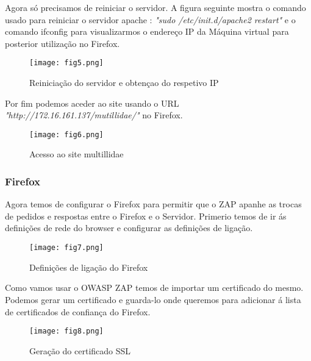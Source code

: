 Agora só precisamos de reiniciar o servidor. A figura seguinte mostra o comando usado para reiniciar o servidor apache : \textit{"sudo /etc/init.d/apache2 restart"} e o comando ifconfig para visualizarmos o endereço IP da Máquina virtual para posterior utilização no Firefox.

\begin{figure}[H]

  \centering

  \texttt{[image: fig5.png]}
 
  \caption{Reiniciação do servidor e obtençao do respetivo IP}

\end{figure}


Por fim podemos aceder ao site usando o URL \textit{"http://172.16.161.137/mutillidae/"} no Firefox.

\begin{figure}[H]

  \centering

  \texttt{[image: fig6.png]}

  \caption{Acesso ao site multillidae}

\end{figure}

\subsubsection{Firefox}

Agora temos de configurar o Firefox para permitir que o ZAP apanhe as trocas de pedidos e respostas entre o Firefox e o Servidor.
Primerio temos de ir ás definições de rede do browser e configurar as definições de ligação.
\begin{figure}[H]

  \centering

  \texttt{[image: fig7.png]}

  \caption{Definições de ligação do Firefox}

\end{figure}

Como vamos usar o OWASP ZAP temos de importar um certificado do mesmo. Podemos gerar um certificado e guarda-lo onde queremos para adicionar á lista de certificados de confiança do Firefox.

\begin{figure}[H]

  \centering

  \texttt{[image: fig8.png]}

  \caption{Geração do certificado SSL}

\end{figure}

